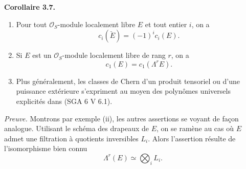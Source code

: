\documentclass[11pt]{article}
\newenvironment{statement}[1]{\par\medskip\noindent\textbf{#1.}\ }{\par\medskip}
\begin{document}
\begin{statement}{Corollaire 3.7}
\begin{enumerate}[label=(\roman*)]
\item Pour tout $\mathcal O_S$-module localement libre $E$ et tout entier $i$, on a
\[
c_i(\check E)=(-1)^i c_i(E).
\]
\item Si $E$ est un $\mathcal O_S$-module localement libre de rang $r$, on a
\[
c_1(E)=c_1(\Lambda^rE).
\]
\item Plus généralement, les classes de Chern d'un produit tensoriel ou d'une puissance extérieure s'expriment au moyen des polynômes universels explicités dans (SGA 6 V 6.1).
\end{enumerate}
\end{statement}

\emph{Preuve.} Montrons par exemple (ii), les autres assertions se voyant de façon analogue. Utilisant le schéma des drapeaux de $E$, on se ramène au cas où $E$ admet une filtration à quotients inversibles $L_i$. Alors l'assertion résulte de l'isomorphisme bien connu
\[
\Lambda^r(E)\simeq\bigotimes_i L_i.
\]
\end{document}
